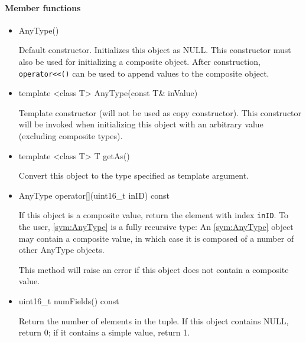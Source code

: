 \paragraph{Member functions}

\begin{itemize}
	\item
		\begin{cppsnippet}
		AnyType()
		\end{cppsnippet}

		Default constructor. Initializes this object as NULL. This constructor must also be used for initializing a composite object. After construction, \texttt{operator<\/<()} can be used to append values to the composite object.

	\item
		\begin{cppsnippet}
		template <class T> AnyType(const T& inValue)
		\end{cppsnippet}

		Template constructor (will not be used as copy constructor). This constructor will be invoked when initializing this object with an arbitrary value (excluding composite types).

	\item
		\begin{cppsnippet}
		template <class T> T getAs()
		\end{cppsnippet}

		Convert this object to the type specified as template argument.

	\item
		\begin{cppsnippet}
		AnyType operator[](uint16_t inID) const
		\end{cppsnippet}

		If this object is a composite value, return the element with index \texttt{inID}. To the user, \ref{sym:AnyType} is a fully recursive type: An \ref{sym:AnyType} object may contain a composite value, in which case it is composed of a number of other AnyType objects.

		This method will raise an error if this object does not contain a composite value.

	\item
		\begin{cppsnippet}
		uint16_t numFields() const
		\end{cppsnippet}

		Return the number of elements in the tuple. If this object contains NULL, return 0; if it contains a simple value, return 1.


\end{itemize}
